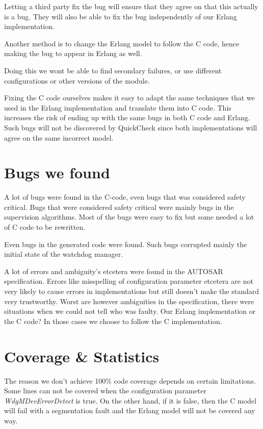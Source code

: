 \documentclass[a4paper]{article}
\begin{document}
Letting a third party fix the bug will ensure that they agree on that
this actually is a bug. They will also be able to fix the bug
independently of our Erlang implementation.

Another method is to change the Erlang model to follow the C code,
hence making the bug to appear in Erlang as well.

Doing this we wont be able to find secondary failures, or use
different configurations or other versions of the module.

Fixing the C code ourselves makes it easy to adapt the same techniques
that we used in the Erlang implementation and translate them into C
code.
This increases the risk of ending up with the same bugs in both C code
and Erlang. Such bugs will not be discovered by QuickCheck since both
implementations will agree on the same incorrect model.

\section{Bugs we found}
A lot of bugs were found in the C-code, even bugs that was considered safety
critical.  Bugs that were considered safety critical were mainly bugs in the
supervision algorithms.  Most of the bugs were easy to fix but some needed a
lot of C code to be rewritten.

Even bugs in the generated code were found. Such bugs corrupted mainly the
initial state of the watchdog manager.

A lot of errors and ambiguity's etcetera were found in the AUTOSAR
specification. Errors like misspelling of configuration parameter etcetera are
not very likely to cause errors in implementations but still doesn't make the
standard very trustworthy. Worst are however ambiguities in the specification,
there were situations when we could not tell who was faulty. Our Erlang
implementation or the C code? In those cases we choose to follow the C
implementation.

\section{Coverage \& Statistics}
The reason we don't achieve 100\% code coverage depends on certain limitations.
Some lines can not be covered when the configuration parameter
\emph{WdgMDevErrorDetect} is true. On the other hand, if it is
false, then the C model will fail with a segmentation fault and the
Erlang model will not be covered any way.
\end{document}
